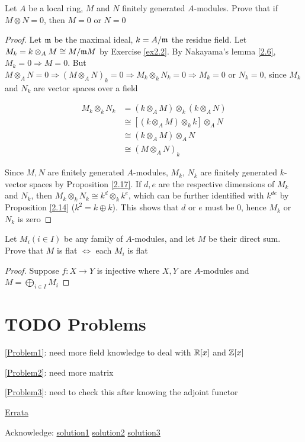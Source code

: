 \documentclass[11pt]{article}
\begin{document}
\begin{exercise}
\label{ex2.3}
Let \(A\) be a local ring, \(M\) and \(N\) finitely generated \(A\)-modules. Prove that
if \(M\otimes N=0\), then \(M=0\) or \(N=0\)
\end{exercise}

\begin{proof}
Let \(\mathfrak{m}\) be the maximal ideal, \(k=A/\mathfrak{m}\) the residue field. Let \(M_k=k\otimes_AM\cong M/\mathfrak{m} M\) by
Exercise \ref{ex2.2}. By Nakayama's lemma \ref{2.6}, \(M_k=0\Rightarrow M=0\).
But \(M\otimes_AN=0\Rightarrow(M\otimes_AN)_k=0\Rightarrow M_k\otimes_kN_k=0\Rightarrow M_k=0\) or \(N_k=0\), since \(M_k\) and \(N_k\) are vector
spaces over a field

\begin{align*}
M_k\otimes_kN_k&=(k\otimes_AM)\otimes_k(k\otimes_AN)\\
&\cong[(k\otimes_AM)\otimes_kk]\otimes_AN\\
&\cong(k\otimes_AM)\otimes_AN\\
&\cong(M\otimes_AN)_k
\end{align*}

Since \(M,N\) are finitely generated \(A\)-modules, \(M_k\), \(N_k\) are finitely
generated \(k\)-vector spaces by Proposition \ref{2.17}. If \(d,e\) are the respective dimensions
of \(M_k\) and \(N_k\), then \(M_k\otimes_kN_k\cong k^d\otimes_kk^e\), which can be further identified
with \(k^{de}\) by Proposition \ref{2.14} (\(k^2=k\oplus k\)). This shows that \(d\) or \(e\) must be 0,
hence \(M_k\) or \(N_k\) is zero
\end{proof}

\begin{exercise}
\label{ex2.4}
Let \(M_i(i\in I)\) be any family of \(A\)-modules, and let \(M\) be their direct sum. Prove
that \(M\) is flat \(\Leftrightarrow\) each \(M_i\) is flat
\end{exercise}

\begin{proof}
Suppose \(f:X\to Y\) is injective where \(X,Y\) are \(A\)-modules and \(M=\bigoplus_{i\in I}M_i\)
\end{proof}

\section{{\bfseries\sffamily TODO} Problems}
\label{sec:org9e299c7}
\ref{Problem1}: need more field knowledge to deal with \(\mathbb{R}[x]\) and \(\mathbb{Z}[x]\)

\ref{Problem2}: need more matrix

\ref{Problem3}: need to check this after knowing the adjoint functor

\href{https://mathoverflow.net/questions/42241/errata-for-atiyah-macdonald}{Errata}

Acknowledge:
\href{https://dangtuanhiep.files.wordpress.com/2008/09/papaioannoua\_solutions\_to\_atiyah.pdf}{solution1} \href{https://www.math.arizona.edu/\~jtaylor/notes/atiyah\_macdonald\_solutions.pdf}{solution2} \href{https://math.sci.uwo.ca/\~jcarlso6/intro\_comm\_alg(2019).pdf}{solution3}
\end{document}
